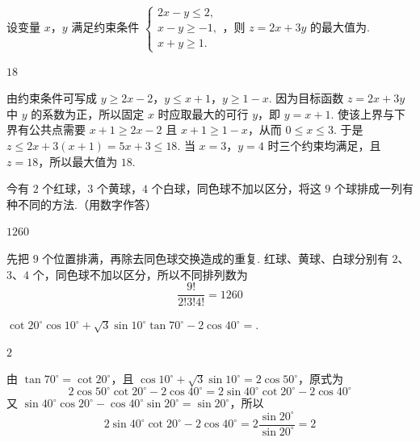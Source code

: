 \begin{problem}
设变量 \(x\)，\(y\) 满足约束条件 \(\begin{cases}
2x - y \leqslant 2,\\
x - y \geqslant -1,\\
x + y \geqslant 1.
\end{cases}\)，则 \(z = 2x + 3y\) 的最大值为\fillinblank{}.
\end{problem}

\begin{answer}
\(18\)
\end{answer}

\begin{solution}
由约束条件可写成 \(y\geqslant2x-2\)，\(y\leqslant x+1\)，\(y\geqslant1-x\). 因为目标函数 \(z=2x+3y\) 中 \(y\) 的系数为正，所以固定 \(x\) 时应取最大的可行 \(y\)，即 \(y=x+1\). 使该上界与下界有公共点需要 \(x+1\geqslant2x-2\) 且 \(x+1\geqslant1-x\)，从而 \(0\leqslant x\leqslant3\). 于是 \(z\leqslant2x+3(x+1)=5x+3\leqslant18\). 当 \(x=3\)，\(y=4\) 时三个约束均满足，且 \(z=18\)，所以最大值为 \(18\).
\end{solution}

\begin{problem}
今有 \(2\) 个红球，\(3\) 个黄球，\(4\) 个白球，同色球不加以区分，将这 \(9\) 个球排成一列有\fillinblank{} 种不同的方法.（用数字作答）
\end{problem}

\begin{answer}
\(1260\)
\end{answer}

\begin{solution}
先把 \(9\) 个位置排满，再除去同色球交换造成的重复. 红球、黄球、白球分别有 \(2\)、\(3\)、\(4\) 个，同色球不加以区分，所以不同排列数为
\[
\frac{9!}{2!3!4!}=1260
\]
\end{solution}

\begin{problem}
\(\cot 20^{\circ}\cos 10^{\circ} + \sqrt{3}\sin 10^{\circ}\tan 70^{\circ} - 2\cos 40^{\circ} =\)\fillinblank{}.
\end{problem}

\begin{answer}
\(2\)
\end{answer}

\begin{solution}
由 \(\tan70^{\circ}=\cot20^{\circ}\)，且 \(\cos10^{\circ}+\sqrt3\sin10^{\circ}=2\cos50^{\circ}\)，原式为
\[
2\cos50^{\circ}\cot20^{\circ}-2\cos40^{\circ}=2\sin40^{\circ}\cot20^{\circ}-2\cos40^{\circ}
\]
又 \(\sin40^{\circ}\cos20^{\circ}-\cos40^{\circ}\sin20^{\circ}=\sin20^{\circ}\)，所以
\[
2\sin40^{\circ}\cot20^{\circ}-2\cos40^{\circ}=2\frac{\sin20^{\circ}}{\sin20^{\circ}}=2
\]
\end{solution}

